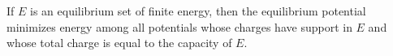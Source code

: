If $E$ is an equilibrium set of finite energy, then the equilibrium potential minimizes energy among all potentials whose charges have support in $E$ and whose total charge is equal to the capacity of $E$.
